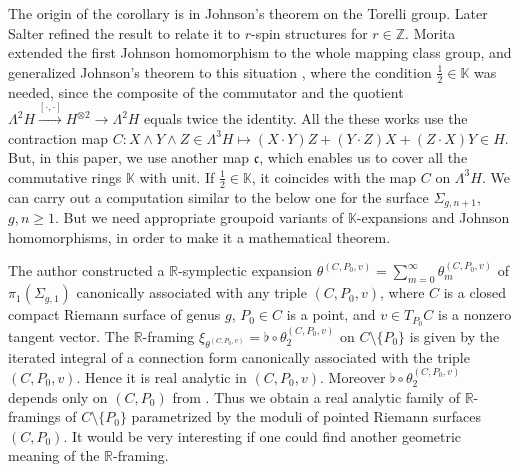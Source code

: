 \documentclass[a4paper,12pt, twoside]{amsart}
\theoremstyle{definition}
\theoremstyle{remark}
\numberwithin{equation}{section}
\newcommand\bK{{\mathbb{K}}}
\newcommand\bR{{\mathbb{R}}}
\newcommand\bZ{{\mathbb{Z}}}
\newcommand\La{\Lambda}
\newcommand\Sgone{\Sigma_{g,1}}
\begin{document}
The origin of the corollary is in Johnson's theorem \cite[Theorem 2]{J80b} on the Torelli group. Later Salter \cite[\S5]{Sal} refined the result to relate it to $r$-spin structures for $r \in \bZ$. 
Morita \cite{Mo93} extended the first Johnson homomorphism to the whole mapping class group, and generalized Johnson's theorem to this situation \cite[Remark 4.9]{Mo93}, where the condition $\frac12 \in \bK$ was needed, since the composite of the commutator and the quotient $\La^2H \overset{[\cdot, \cdot]}\to H^{\otimes 2} \to \La^2H$ equals twice the identity. 
All the these works use the contraction map $C: X\wedge Y \wedge Z  \in\La^3H \mapsto (X\cdot Y)Z + (Y\cdot Z)X + (Z\cdot X)Y \in H$. 
But, in this paper,  we use another map $\mathfrak{c}$, which enables us to cover all the commutative rings $\bK$ with unit. 
If $\frac12\in \bK$, it coincides with the map $C$ on $\La^3H$. 
We can carry out a computation similar to the below one for the surface $\Sigma_{g, n+1}$, $g, n \geq 1$. But we need appropriate groupoid variants of $\bK$-expansions and Johnson homomorphisms, in order to make it a mathematical theorem. 
\par
The author \cite{Kaw06} constructed a $\bR$-symplectic expansion $\theta^{(C, P_0, v)} = \sum^\infty_{m=0}\theta^{(C, P_0, v)}_m$ of $\pi_1(\Sgone)$ canonically associated with any triple $(C, P_0, v)$, where $C$ is a closed compact Riemann surface of genus $g$, $P_0 \in C$ is a point, and $v \in T_{P_0}C$ is a nonzero tangent vector. 
The $\bR$-framing $\xi_{\theta^{(C, P_0, v)}}= \flat\circ \theta^{(C, P_0, v)}_2$ on $C \setminus \{P_0\}$ is given by the iterated integral of a connection form canonically associated with the triple $(C, P_0, v)$. 
Hence it is real analytic in $(C, P_0, v)$. 
Moreover $\flat\circ\theta^{(C, P_0, v)}_2$ depends only on $(C, P_0)$ from \cite[Proposition 6.3]{Kaw06}. 
Thus we obtain a real analytic family of $\bR$-framings of $C\setminus \{P_0\}$ parametrized by the moduli of pointed Riemann surfaces $(C, P_0)$.
It would be very interesting if one could find another geometric meaning of the $\bR$-framing. 
\par
\end{document}
